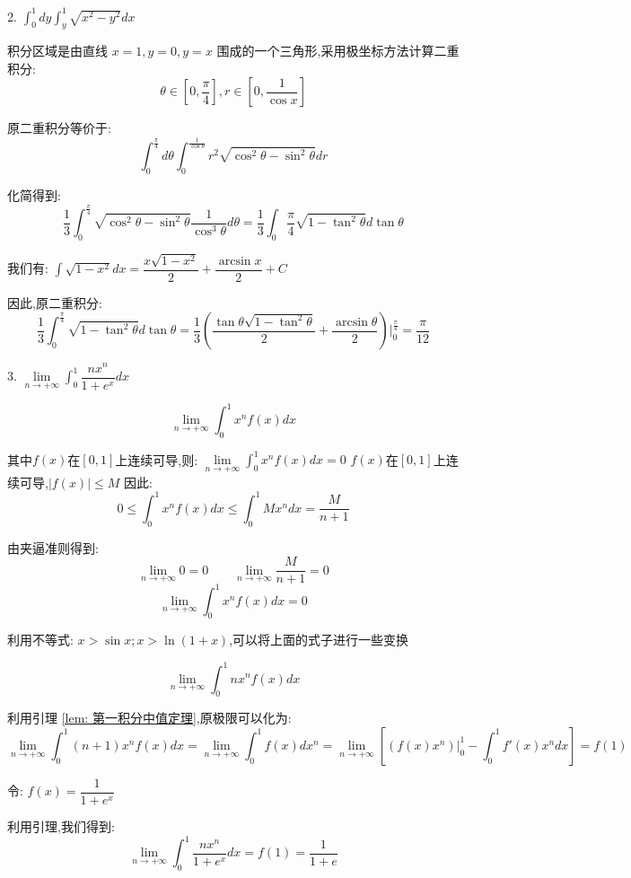 2. $\int_{0}^{1}dy\int_{y}^{1}\sqrt{x^2-y^2}dx$
\begin{solution}
	
	积分区域是由直线 $x=1,y=0,y=x$ 围成的一个三角形,采用极坐标方法计算二重积分: 
	$$\theta\in[0,\dfrac{\pi}{4}],r\in[0,\dfrac{1}{\cos x}]$$
	
	原二重积分等价于: 
	$$\int_{0}^{\frac{\pi}{4}}d\theta\int_{0}^{\frac{1}{\cos \theta}}r^2\sqrt{\cos^{2}\theta-\sin^{2}\theta}dr$$
	
	化简得到: 
	$$\frac{1}{3}\int_{0}^{\frac{\pi}{4}}\sqrt{\cos^{2}\theta-\sin^{2}\theta}\frac{1}{\cos^{3}\theta}d\theta=\frac{1}{3}\int_{0}{\frac{\pi}{4}}\sqrt{1-\tan^{2}\theta}d\tan \theta$$
	
	我们有: $\int\sqrt{1-x^2}dx=\dfrac{x\sqrt{1-x^2}}{2}+\dfrac{\arcsin x}{2}+C$
	
	因此,原二重积分: $$\dfrac{1}{3}\int_{0}^{\frac{\pi}{4}}\sqrt{1-\tan^{2}\theta}d\tan \theta=\dfrac{1}{3}(\dfrac{\tan \theta\sqrt{1-\tan^{2}\theta}}{2}+\dfrac{\arcsin \theta}{2} )|_{0}^{\frac{\pi}{4}} =\dfrac{\pi}{12}$$
\end{solution}


3. $\lim\limits_{n\rightarrow +\infty}\int_{0}^{1}\dfrac{nx^n}{1+e^x}dx$
\begin{lemma}[第一积分中值定理]\label{lem: 第一积分中值定理}
	
	$$\lim\limits_{n\rightarrow +\infty}\int_{0}^{1}x^nf(x)dx$$
	
	其中$f(x)$在$[0,1]$上连续可导,则: $\lim\limits_{n\rightarrow +\infty}\int_{0}^{1}x^nf(x)dx=0$
	$f(x)$在$[0,1]$上连续可导,$|f(x)|\leq M$
	因此: 
	$$0\leq\int_{0}^{1}x^nf(x)dx\leq\int_{0}^{1}Mx^ndx=\frac{M}{n+1}$$
	
	由夹逼准则得到: 
	$$\lim\limits_{n\rightarrow +\infty}0=0\quad\quad \lim\limits_{n\rightarrow +\infty}\frac{M}{n+1}=0$$
	$$\lim\limits_{n\rightarrow +\infty}\int_{0}^{1}x^nf(x)dx=0$$
	
	利用不等式: $x>\sin x;x>\ln(1+x)$,可以将上面的式子进行一些变换
	
\end{lemma}
\begin{lemma}
	
	$$\lim\limits_{n\rightarrow +\infty}\int_{0}^{1}nx^nf(x)dx$$
	
	利用引理 \ref{lem: 第一积分中值定理},原极限可以化为: 
	$$\lim\limits_{n\rightarrow +\infty}\int_{0}^{1}(n+1)x^nf(x)dx=\lim\limits_{n\rightarrow +\infty}\int_{0}^{1}f(x)dx^n=\lim\limits_{n\rightarrow+\infty}[(f(x)x^n)|_{0}^{1}-\int_{0}^{1}f'(x)x^ndx]=f(1)$$
\end{lemma}
\begin{solution}
	
	令: $f(x)=\dfrac{1}{1+e^x}$
	
	利用引理,我们得到: $$\lim\limits_{n\rightarrow +\infty}\int_{0}^{1}\dfrac{nx^n}{1+e^x}dx=f(1)=\dfrac{1}{1+e}$$
\end{solution}

